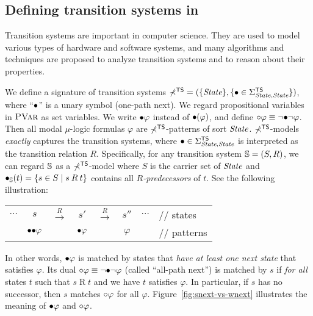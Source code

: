 \documentclass{almostllncs}
\begin{document}
\subsection{Defining transition systems in \MmuL}

Transition systems are important in computer science. They are used to model various
types of hardware and software systems, and many algorithms and techniques are proposed
to analyze transition systems and to reason about their properties.

We define a signature of transition systems $\mathbb{\Sigma}^{\textnormal{\textsf{TS}}} = ( \{ \textit{State} \} , \{ {\bullet} \in \Sigma^{\textnormal{\textsf{TS}}}_{\textit{State},\textit{State}} \} )$, where ``${\bullet}$'' is a unary symbol (one-path next).
We regard propositional variables in ${\normalfont\textsc{PVar}}$ as \mmul set variables.
We write ${\bullet} \varphi$ instead of ${\bullet} (\varphi)$,
and define ${\circ} \varphi \equiv \neg {\bullet} \neg \varphi$.
Then all modal $\mu$-logic formulas $\varphi$ are \mmul $\mathbb{\Sigma}^{\textnormal{\textsf{TS}}}$-patterns of sort $\textit{State}$.
$\mathbb{\Sigma}^{\textnormal{\textsf{TS}}}$-models {\em exactly} captures the transition systems, where
${\bullet} \in \Sigma^{\textnormal{\textsf{TS}}}_{\textit{State},\textit{State}}$ is interpreted as the transition relation $R$.
Specifically, for any transition system
$\mathbb{S} = (S,R)$, we can regard $\mathbb{S}$ as a $\mathbb{\Sigma}^{\textnormal{\textsf{TS}}}$-model
where $S$ is the carrier set of $\textit{State}$ and
${\bullet}_{\mathbb{S}}(t) = \{ s \in S \mid s \mathbin{R} t \}$ contains all \emph{$R$-predecessors} of $t$. See the following illustration:

\begin{tabular}{cccccccl}
$\cdots$ & $s$ & $\xrightarrow{R}$ & $s'$  & $\xrightarrow{R}$ & $s''$ & 
$\cdots$ & // states \\
& ${\bullet} {\bullet} \varphi$ && ${\bullet} \varphi$ && $\varphi$
&& // patterns
\end{tabular}

\noindent
In other words, ${\bullet} \varphi$ is matched by states that \emph{have at least one next state} that satisfies $\varphi$.
Its dual ${\circ} \varphi \equiv \neg {\bullet} \neg \varphi$ (called ``all-path next'') is matched by $s$ if \emph{for all} states $t$ such that $s \mathbin{R} t$ and
we have $t$ satisfies $\varphi$.
In particular, if $s$ has no successor, then $s$ matches ${\circ} \varphi$ for all $\varphi$.
Figure~\ref{fig:snext-vs-wnext} illustrates the meaning of ${\bullet} \varphi$ and ${\circ} \varphi$.
\end{document}
